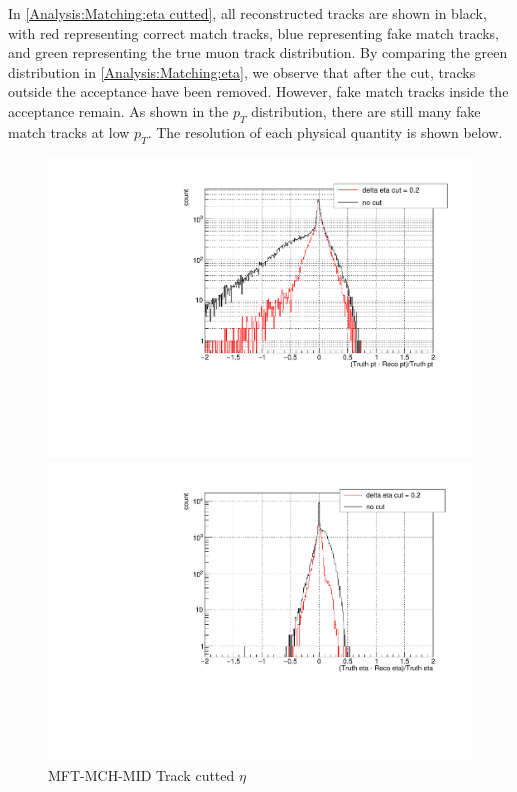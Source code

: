                 In \ref{Analysis:Matching:eta cutted}, all reconstructed tracks are shown in black, with red representing correct match tracks, blue representing fake match tracks, and green representing the true muon track distribution. By comparing the green distribution in \ref{Analysis:Matching:eta}, we observe that after the cut, tracks outside the acceptance have been removed. However, fake match tracks inside the acceptance remain. As shown in the $p_T$ distribution, there are still many fake match tracks at low $p_T$.\@
                The resolution of each physical quantity is shown below.
                \begin{figure}[htbp]
                    \centering
                    \begin{minipage}{0.45\textwidth} %
                        \centering
                        \includegraphics[width=\textwidth]{fig/3_3_pt_resolution.pdf} %
                        \caption{MFT-MCH-MID Track cutted $\eta$}
                        \label{Analysis:Matching:pt resolution}
                    \end{minipage}
                    \begin{minipage}{0.45\textwidth}
                        \centering
                        \includegraphics[width=\textwidth]{fig/3_3_eta_resolution.pdf} %

\end{minipage}
\end{figure}
